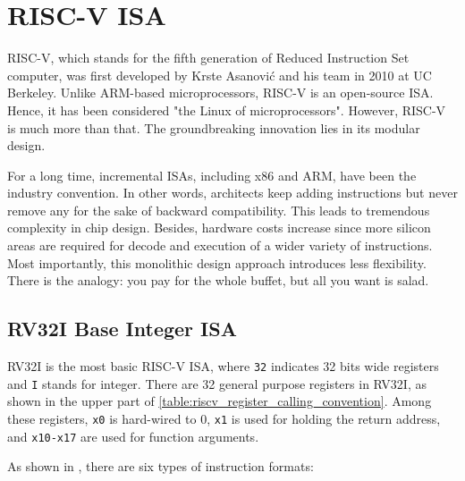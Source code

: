 \section{RISC-V ISA}

RISC-V, which stands for the fifth generation of Reduced Instruction Set computer, was first developed by Krste Asanović and his team in 2010 at UC Berkeley.
Unlike ARM-based microprocessors, RISC-V is an open-source ISA. Hence, it has been considered "the Linux of microprocessors".
However, RISC-V is much more than that. The groundbreaking innovation lies in its modular design.

For a long time, incremental ISAs, including x86 and ARM, have been the industry convention. In other words, architects keep adding instructions but never remove any for the sake of backward compatibility.  
This leads to tremendous complexity in chip design. Besides, hardware costs increase since more silicon areas are required for decode and execution of a wider variety of instructions. Most importantly,
this monolithic design approach introduces less flexibility. There is the analogy: you pay for the whole buffet, but all you want is salad.

\subsection{RV32I Base Integer ISA}
RV32I is the most basic RISC-V ISA, where \texttt{32} indicates 32 bits wide registers and \texttt{I} stands for integer. There are 32 general purpose registers in RV32I, as shown in the upper part of \cref{table:riscv_register_calling_convention}. Among these registers, \texttt{x0} is hard-wired to 0, \texttt{x1} is used for holding the return address, and \texttt{x10-x17} are used for function arguments.

As shown in , there are six types of instruction formats:

